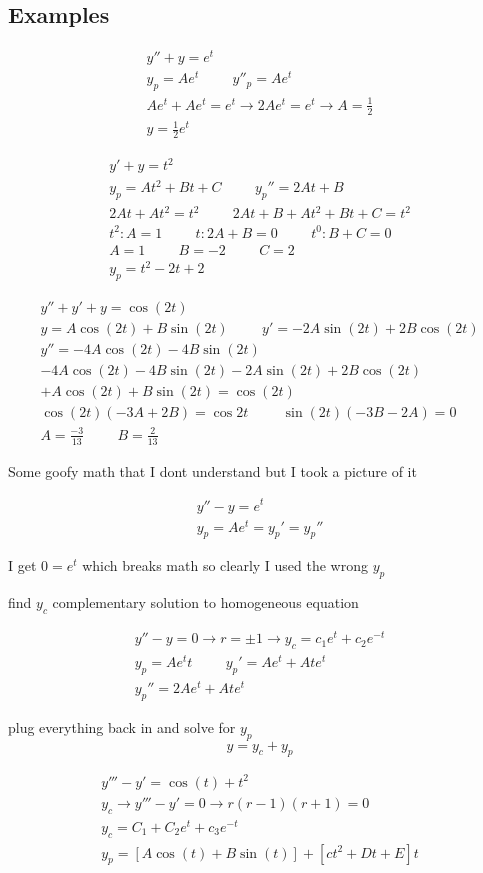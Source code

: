 \documentclass[fleqn]{report}
\newcommand{\hp}{\hspace{1cm}}
\newcommand{\equations} [1] {
\begin{gather*}
#1
\end{gather*}
}
\begin{document}
\subsection{Examples}
\equations{
y'' + y = e^t 
\\
y_p = Ae^{t} \hp 
y''_p = Ae^t
\\
Ae^t + Ae^t = e^t
\rightarrow
2Ae^t = e^t
\rightarrow
A = \frac{1}{2}
\\
y = \frac{1}{2} e^t
}

\equations{
y' + y = t^2
\\
y_p = At^2 + Bt + C
\hp
y_p'' = 2At + B
\\
2At + At^2 = t^2
\hp
2At + B + At^2 + Bt + C = t^2
\\
t^2: A = 1 \hp
t: 2A + B = 0 \hp
t^0: B + C = 0
\\
A = 1
\hp
B = -2 
\hp
C = 2
\\
y_p = t^2 - 2t + 2
}

\equations{
y'' + y' + y = \cos (2t)
\\
y = A \cos (2t) + B \sin (2t)
\hp
y' = -2A \sin (2t) + 2B \cos (2t)
\\
y'' = -4A \cos (2t) - 4 B \sin (2t)
\\
-4A \cos (2t) - 4 B \sin (2t) - 2A \sin (2t) + 2B \cos (2t)
\\
+  A \cos (2t) + B \sin (2t)
=
\cos (2t)
\\
\cos(2t) (-3A + 2B) = \cos 2t
\hp
\sin (2t) (-3B - 2A) = 0
\\
A = \frac{-3}{13}
\hp
B = \frac{2}{13}
}
Some goofy math that I dont understand but I took a picture of it 


\equations{
y'' - y = e^t
\\
y_p = Ae^t = y_p' = y_p''
}
I get $0 = e^t$ which breaks math so clearly I used the wrong $y_p$

find $y_c$ complementary solution to homogeneous equation
\equations{
y'' - y = 0
\rightarrow
r = \pm 1
\rightarrow
y_c = c_1e^t + c_2 e^{-t}
\\
y_p = Ae^t t
\hp
y_p' = Ae^t + Ate^t
\\
y_p'' = 2Ae^t + Ate^t
}
plug everything back in and solve for $y_p$
\[
y = y_c + y_p
\]

\equations{
y''' - y' = \cos(t) + t^2
\\
y_c \longrightarrow y''' - y' = 0
\rightarrow
r(r - 1)(r + 1) = 0
\\
y_c = C_1 + C_2 e^t + c_3e^{-t}
\\
y_p = [A \cos (t) + B \sin (t)] + [ct^2 + Dt + E]t
\\
}
\end{document}
